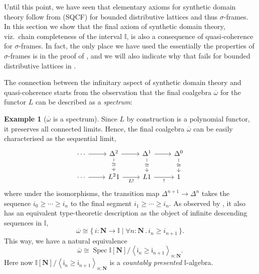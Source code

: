 \documentclass[a4paper,12pt]{amsart}
\theoremstyle{definition}
\newtheorem{example}[theorem]{Example}
\newcommand{\mb}[1]{\mathbf{#1}}
\newcommand{\mbb}[1]{\mathbb{#1}}
\newcommand{\I}{\mbb I}
\newcommand{\ms}[1]{\mathsf{#1}}
\newcommand{\ov}[1]{\overline{#1}}
\newcommand{\pair}[1]{\left\langle#1\right\rangle}
\newcommand{\scomp}[2]{\{\,#1\mid#2\,\}}
\newcommand{\N}{\mb N}
\newcommand{\fa}[2]{\forall #1\!\colon\!\!#2\mathpunct{.}}
\newcommand{\spec}{\operatorname{Spec}}
\begin{document}
Until this point, we have seen that elementary axioms for synthetic domain theory follow from (SQCF) for bounded distributive lattices and thus $\sigma$-frames. In this section we show that the final axiom of synthetic domain theory, viz.\ chain completeness of the interval $\I$, is also a consequence of quasi-coherence for $\sigma$-frames.  In fact, the only place we have used the essentially the properties of $\sigma$-frames is in the proof of , and we will also indicate why that fails for bounded distributive lattices in .

The connection between the infinitary aspect of synthetic domain theory and quasi-coherence starts from the observation that the final coalgebra $\ov\omega$ for the functor $L$ can be described as a \emph{spectrum}:

\begin{example}[$\ov\omega$ is a spectrum]\label{exm:ovomegaaffine}
  Since $L$ by construction is a polynomial functor, it preserves all connected limits. Hence, the final coalgebra $\ov\omega$ can be easily characterised as the sequential limit, 
  \[\begin{tikzcd}
    \cdots & {\Delta^2} & {\Delta^1} & {\Delta^0} \\
    \cdots & {L^21} & L1 & 1
    \arrow[from=1-1, to=1-2]
    \arrow[from=1-2, to=1-3]
    \arrow["\cong"{description}, from=1-2, to=2-2]
    \arrow[from=1-3, to=1-4]
    \arrow["\cong"{description}, from=1-3, to=2-3]
    \arrow["\cong"{description}, from=1-4, to=2-4]
    \arrow[from=2-1, to=2-2]
    \arrow["{L!}"', from=2-2, to=2-3]
    \arrow["{!}"', from=2-3, to=2-4]
  \end{tikzcd}\]
  where under the isomorphisms, the transition map $\Delta^{n+1} \to \Delta^n$ takes the sequence $i_0 \ge \cdots \ge i_n$ to the final segment $i_1 \ge \cdots \ge i_n$. As observed by \citet[Sec.\ 5.2]{hyland1990first}, it also has an equivalent type-theoretic description as the object of infinite descending sequences in $\I$,
  \[ \ov\omega \cong \scomp{i : \N \to \I}{\fa n\N i_n \ge i_{n+1}}\text{.} \]
  This way, we have a natural equivalence
  \[ \ov\omega \cong \spec\I[\N]/\pair{\ms{i}_n \ge \ms{i}_{n+1}}_{n:\N}\text{.} \]
  Here now $\I[\N]/\pair{\ms{i}_n \ge \ms{i}_{n+1}}_{n:\N}$ is a \emph{countably presented} $\I$-algebra.
\end{example}
\end{document}

